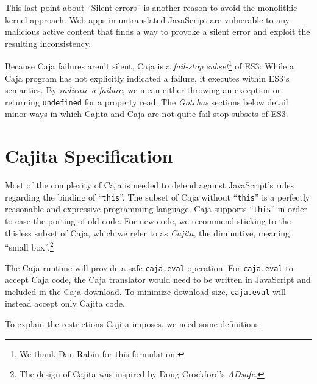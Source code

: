 \documentclass[letterpaper,twocolumn,10pt]{article}
\newcommand{\code}[1]{{\tt {#1}}}              %
\begin{document}
This last point about ``Silent errors'' is another reason to avoid the 
monolithic kernel approach. Web apps in untranslated JavaScript are 
vulnerable to any malicious active content that finds a way to provoke a 
silent error and exploit the resulting inconsistency.

Because Caja failures aren't silent, Caja is a \emph{fail-stop 
subset}\footnote{
%
We thank Dan Rabin for this formulation.
%
} of ES3: While a Caja program has not explicitly indicated a failure, 
it executes within ES3's semantics. By \emph{indicate a failure}, we 
mean either throwing an exception or returning \code{undefined} for a 
property read. The \emph{Gotchas} sections below detail minor ways in which 
Cajita and Caja are not quite fail-stop subsets of ES3.


\section{Cajita Specification}
\label{sec:cajita-spec}

Most of the complexity of Caja is needed to defend against JavaScript's rules 
regarding the binding of ``\code{this}''. The subset of Caja without 
``\code{this}'' is a perfectly reasonable and expressive programming 
language. Caja supports ``\code{this}'' in order to ease the porting of old 
code. For new code, we recommend sticking to the thisless subset of Caja, 
which we refer to as \emph{Cajita}, the diminutive, meaning ``small 
box''.\footnote{
%
The design of Cajita was inspired by Doug Crockford's \emph{ADsafe}.
%
}

The Caja runtime will provide a safe \code{caja.eval} operation. For 
\code{caja.eval} to accept Caja code, the Caja translator would need to be 
written in JavaScript and included in the Caja download. To minimize download 
size, \code{caja.eval} will instead accept only Cajita code.

To explain the restrictions Cajita imposes, we need some definitions.
\end{document}
